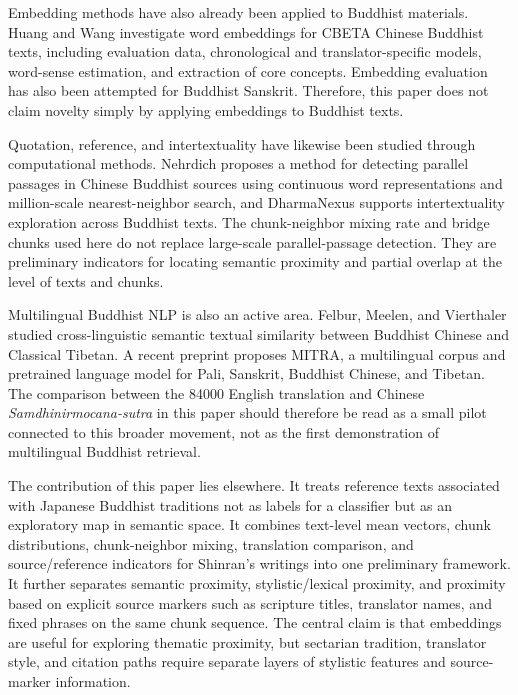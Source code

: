 \documentclass[uplatex,dvipdfmx,11pt,a4paper]{jsarticle}
\begin{document}
Embedding methods have also already been applied to Buddhist materials. Huang and Wang investigate word embeddings for CBETA Chinese Buddhist texts, including evaluation data, chronological and translator-specific models, word-sense estimation, and extraction of core concepts\cite{huang2023}. Embedding evaluation has also been attempted for Buddhist Sanskrit\cite{lugli2022}. Therefore, this paper does not claim novelty simply by applying embeddings to Buddhist texts.

Quotation, reference, and intertextuality have likewise been studied through computational methods. Nehrdich proposes a method for detecting parallel passages in Chinese Buddhist sources using continuous word representations and million-scale nearest-neighbor search\cite{nehrdich2020}, and DharmaNexus supports intertextuality exploration across Buddhist texts\cite{dharmanexus}. The chunk-neighbor mixing rate and bridge chunks used here do not replace large-scale parallel-passage detection. They are preliminary indicators for locating semantic proximity and partial overlap at the level of texts and chunks.

Multilingual Buddhist NLP is also an active area. Felbur, Meelen, and Vierthaler studied cross-linguistic semantic textual similarity between Buddhist Chinese and Classical Tibetan\cite{felbur2022}. A recent preprint proposes MITRA, a multilingual corpus and pretrained language model for Pali, Sanskrit, Buddhist Chinese, and Tibetan\cite{mitra2026}. The comparison between the 84000 English translation and Chinese \textit{Samdhinirmocana-sutra} in this paper should therefore be read as a small pilot connected to this broader movement, not as the first demonstration of multilingual Buddhist retrieval.

The contribution of this paper lies elsewhere. It treats reference texts associated with Japanese Buddhist traditions not as labels for a classifier but as an exploratory map in semantic space. It combines text-level mean vectors, chunk distributions, chunk-neighbor mixing, translation comparison, and source/reference indicators for Shinran's writings into one preliminary framework. It further separates semantic proximity, stylistic/lexical proximity, and proximity based on explicit source markers such as scripture titles, translator names, and fixed phrases on the same chunk sequence. The central claim is that embeddings are useful for exploring thematic proximity, but sectarian tradition, translator style, and citation paths require separate layers of stylistic features and source-marker information.
\end{document}
